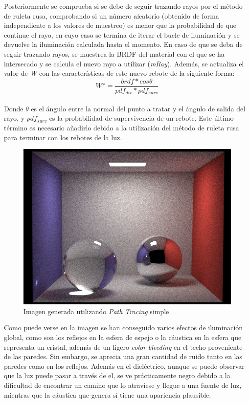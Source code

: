 \documentclass[10pt,oneside,a4paper]{article}
\begin{document}
Posteriormente se comprueba si se debe de seguir trazando rayos por el método de ruleta rusa, comprobando si un número aleatorio (obtenido de forma independiente a los valores de muestreo) es menor que la probabilidad de que continue el rayo, en cuyo caso se termina de iterar el bucle de iluminación y se devuelve la iluminación calculada hasta el momento. En caso de que se deba de seguir trazando rayos, se muestrea la BRDF del material con el que se ha intersecado y se calcula el nuevo rayo a utilizar (\textit{mRay}). Además, se actualiza el valor de \textit{W} con las características de este nuevo rebote de la siguiente forma:
$$W *= \frac{brdf * cos\theta}{pdf_{dir} * pdf_{surv}}$$\\

Donde $\theta$ es el ángulo entre la normal del punto a tratar y el ángulo de salida del rayo, y $pdf_{surv}$ es la probabilidad de supervivencia de un rebote. Este último término es necesario añadirlo debido a la utilización del método de ruleta rusa para terminar con los rebotes de la luz.\\

\begin{figure}[h]
\centering
\includegraphics[width=.6\linewidth]{images/cbox_path_512.png}
\caption{Imagen generada utilizando \textit{Path Tracing} simple}
\label{fig:disp}
\end{figure}

Como puede verse en la imagen se han conseguido varios efectos de iluminación global, como son los reflejos en la esfera de espejo o la cáustica en la esfera que representa un cristal, además de un ligero \textit{color bleeding} en el techo proveniente de las paredes. Sin embargo, se aprecia una gran cantidad de ruido tanto en las paredes como en los reflejos. Además en el dieléctrico, aunque se puede observar que la luz puede pasar a través de el, se ve prácticamente negro debido a la dificultad de encontrar un camino que lo atraviese y llegue a una fuente de luz, mientras que la cáustica que genera sí tiene una apariencia plausible.\\
\end{document}
